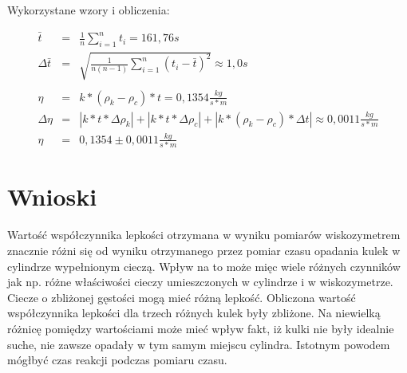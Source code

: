 \documentclass[wide,a4paper,titlepage,12pt]{mwart}
\begin{document}
    Wykorzystane wzory i obliczenia:
    
    \begin{eqnarray*}
      \bar{t} &=& \frac{1}{n} \sum_{i=1}^{n} t_i = 161,76 s\\
      \Delta \bar{t} &=& \sqrt{\frac{1}{n(n-1)} \sum_{i=1}^{n} (t_i - \bar{t})^2} \approx 1,0 s\\ \\
      \eta &=& k*(\rho_k - \rho_c) * t = 0,1354 \frac{kg}{s*m}\\
      \Delta \eta &=& \left |k*t*\Delta \rho_k \right | + \left |k*t*\Delta \rho_c \right| + \left|k*(\rho_k - \rho_c) * \Delta t \right| \approx 0,0011 \frac{kg}{s*m}\\
      \eta &=& 0,1354 \pm 0,0011 \frac{kg}{s*m}
    \end{eqnarray*}
    

    
  \section{Wnioski}
  \label{sec:Wnioski}
    
    Wartość współczynnika lepkości otrzymana w wyniku pomiarów wiskozymetrem znacznie różni się od wyniku otrzymanego przez pomiar czasu opadania kulek w cylindrze wypełnionym cieczą. Wpływ na to może mięc wiele różnych czynników jak np. różne właściwości cieczy umieszczonych w cylindrze i w wiskozymetrze. Ciecze o zbliżonej gęstości mogą mieć różną lepkość.
    \newline
    Obliczona wartość współczynnika lepkości dla trzech różnych kulek były zbliżone. Na niewielką różnicę pomiędzy wartościami może mieć wpływ fakt, iż kulki nie były idealnie suche, nie zawsze opadały w tym samym miejscu cylindra. Istotnym powodem mógłbyć czas reakcji podczas pomiaru czasu.


  
\end{document}
